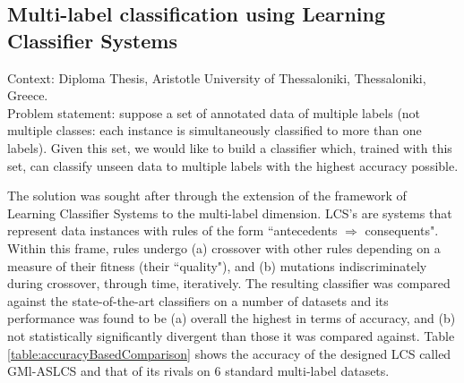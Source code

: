 \subsection{Multi-label classification using Learning Classifier Systems}

Context: Diploma Thesis, Aristotle University of Thessaloniki, Thessaloniki, Greece.\\

Problem statement: suppose a set of annotated data of multiple labels (not
multiple classes: each instance is simultaneously classified to more than one
labels). Given this set, we would like to build a classifier which, trained with
this set, can classify unseen data to multiple labels with the highest accuracy
possible.

The solution was sought after through the extension of the framework of Learning
Classifier Systems to the multi-label dimension. LCS's are systems that
represent data instances with rules of the form ``antecedents $\Rightarrow$
consequents". Within this frame, rules undergo (a) crossover with other rules
depending on a measure of their fitness (their ``quality"), and (b) mutations
indiscriminately during crossover, through time, iteratively. The resulting
classifier was compared against the state-of-the-art classifiers on a number of
datasets and its performance was found to be (a) overall the highest in terms of
accuracy, and (b) not statistically significantly divergent than those it was
compared against. Table \ref{table:accuracyBasedComparison} shows the accuracy
of the designed LCS called GMl-ASLCS and that of its rivals on 6 standard
multi-label datasets.

